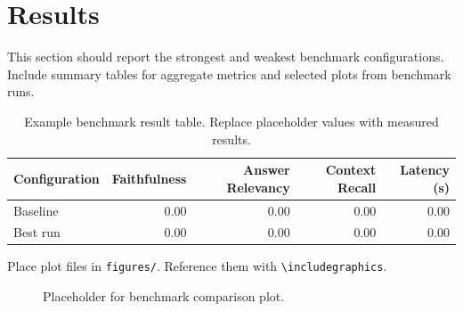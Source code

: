\section{Results}

This section should report the strongest and weakest benchmark configurations. Include summary tables for aggregate metrics and selected plots from benchmark runs.

\begin{table}[htbp]
    \centering
    \caption{Example benchmark result table. Replace placeholder values with measured results.}
    \label{tab:results}
    \begin{tabular}{lrrrr}
        \hline
        Configuration & Faithfulness & Answer Relevancy & Context Recall & Latency (s) \\
        \hline
        Baseline & 0.00 & 0.00 & 0.00 & 0.00 \\
        Best run & 0.00 & 0.00 & 0.00 & 0.00 \\
        \hline
    \end{tabular}
\end{table}

Place plot files in \texttt{figures/}. Reference them with \texttt{\textbackslash includegraphics}.

\begin{figure}[htbp]
    \centering
    \fbox{\rule{0pt}{4cm}\rule{0.8\linewidth}{0pt}}
    \caption{Placeholder for benchmark comparison plot.}
    \label{fig:comparison}
\end{figure}
